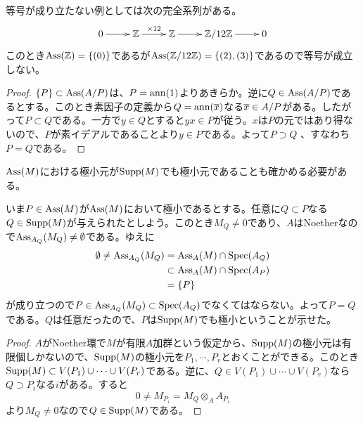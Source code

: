 \begin{rem}
  等号が成り立たない例としては次の完全系列がある。
  \[
  \xymatrix{
  0 \ar[r] & \Z \ar[r]^{\times 12} & \Z \ar[r] & \Z / 12 \Z \ar[r] & 0
  }
  \]
  このとき$\operatorname{Ass}({\mathbb Z}) = \{ (0) \} $であるが$\operatorname{Ass}( {\mathbb Z} / 12 {\mathbb Z}) = \{ (2), (3)\}$であるので等号が成立しない。
\end{rem}


\begin{proof}
$\{ P \} \subset \operatorname{Ass}(A/P)$は、$P=\operatorname{ann}(1)$よりあきらか。逆に$Q \in \operatorname{Ass}(A/P)$であるとする。このとき素因子の定義から$Q = \operatorname{ann}(\overline{x})$なる$\overline{x} \in A/P$がある。したがって$P \subset Q$である。一方で$y \in Q$とすると$yx \in P$が従う。$x$は$P$の元ではあり得ないので、$P$が素イデアルであることより$y \in P$である。よって$P \supset Q$
、すなわち$P = Q$である。
\end{proof}





\begin{rem}
  $\operatorname{Ass}(M)$における極小元が$\operatorname{Supp}(M)$でも極小元であることも確かめる必要がある。

  いま$P \in \operatorname{Ass}(M)$が$\operatorname{Ass}(M)$において極小であるとする。任意に$Q \subset P$なる$Q \in \operatorname{Supp}(M)$が与えられたとしよう。このとき$M_Q \neq 0$であり、$A$はNoetherなので$\operatorname{Ass}_{A_Q}(M_Q) \neq \emptyset$である。ゆえに
  \begin{align*}
  \emptyset \neq \operatorname{Ass}_{A_Q}(M_Q) &= \operatorname{Ass}_A(M) \cap \operatorname{Spec} (A_Q) \\
  &\subset \operatorname{Ass}_A(M) \cap \operatorname{Spec} (A_P) \\
  &= \{ P \}
\end{align*}
が成り立つので$P \in \operatorname{Ass}_{A_Q}(M_Q) \subset \operatorname{Spec} (A_Q)$でなくてはならない。よって$P = Q$である。$Q$は任意だったので、$P$は$\operatorname{Supp}(M)$でも極小ということが示せた。
\end{rem}




\begin{proof}
  $A$がNoether環で$M$が有限$A$加群という仮定から、$\operatorname{Supp}(M)$の極小元は有限個しかないので、$\operatorname{Supp}(M)$の極小元を$P_1, \cdots , P_r$とおくことができる。このとき$\operatorname{Supp}(M) \subset V(P_1) \cup \cdots \cup V(P_r)$である。逆に、$Q \in V(P_1) \cup \cdots \cup V(P_r)$なら$Q \supset P_i$なる$i$がある。すると
  \[
  0 \neq M_{P_i} = M_Q \otimes_A A_{P_i}
  \]
  より$M_Q \neq 0$なので$Q \in \operatorname{Supp}(M)$である。
\end{proof}




